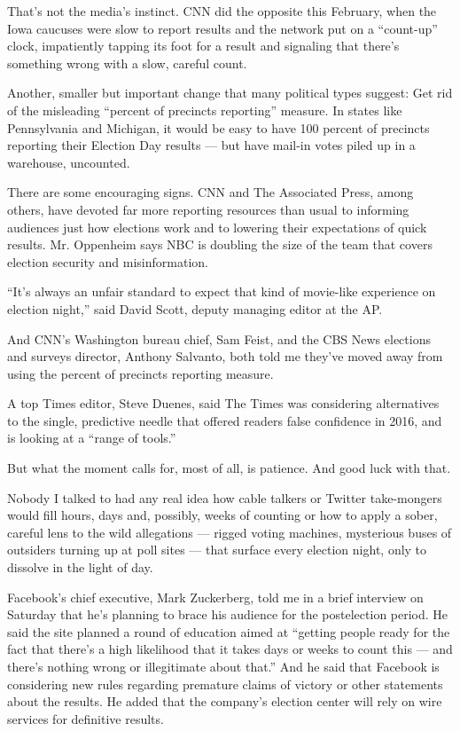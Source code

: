 That's not the media's instinct. CNN did the opposite this February,
when the Iowa caucuses were slow to report results and the network put
on a ``count-up'' clock, impatiently tapping its foot for a result and
signaling that there's something wrong with a slow, careful count.

Another, smaller but important change that many political types suggest:
Get rid of the misleading ``percent of precincts reporting'' measure. In
states like Pennsylvania and Michigan, it would be easy to have 100
percent of precincts reporting their Election Day results --- but have
mail-in votes piled up in a warehouse, uncounted.

There are some encouraging signs. CNN and The Associated Press, among
others, have devoted far more reporting resources than usual to
informing audiences just how elections work and to lowering their
expectations of quick results. Mr. Oppenheim says NBC is doubling the
size of the team that covers election security and misinformation.

``It's always an unfair standard to expect that kind of movie-like
experience on election night,'' said David Scott, deputy managing editor
at the AP.

And CNN's Washington bureau chief, Sam Feist, and the CBS News elections
and surveys director, Anthony Salvanto, both told me they've moved away
from using the percent of precincts reporting measure.

A top Times editor, Steve Duenes, said The Times was considering
alternatives to the single, predictive needle that offered readers false
confidence in 2016, and is looking at a ``range of tools.''

But what the moment calls for, most of all, is patience. And good luck
with that.

Nobody I talked to had any real idea how cable talkers or Twitter
take-mongers would fill hours, days and, possibly, weeks of counting or
how to apply a sober, careful lens to the wild allegations --- rigged
voting machines, mysterious buses of outsiders turning up at poll sites
--- that surface every election night, only to dissolve in the light of
day.

Facebook's chief executive, Mark Zuckerberg, told me in a brief
interview on Saturday that he's planning to brace his audience for the
postelection period. He said the site planned a round of education aimed
at ``getting people ready for the fact that there's a high likelihood
that it takes days or weeks to count this --- and there's nothing wrong
or illegitimate about that.'' And he said that Facebook is considering
new rules regarding premature claims of victory or other statements
about the results. He added that the company's election center will rely
on wire services for definitive results.


